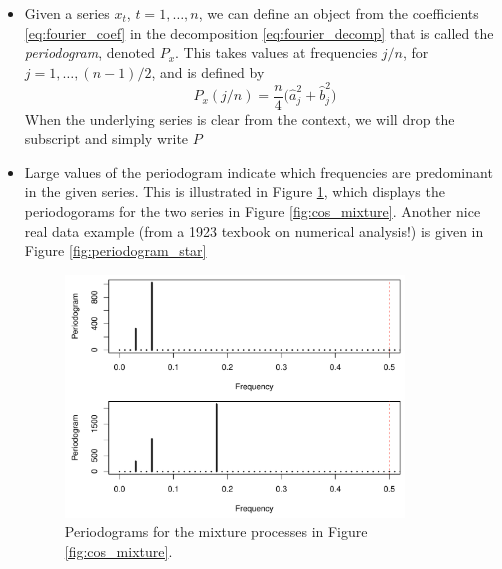 \documentclass{article}
\begin{document}
\begin{itemize}
\item Given a series $x_t$, $t = 1,\dots,n$, we can define an object from the
  coefficients \eqref{eq:fourier_coef} in the decomposition
  \eqref{eq:fourier_decomp} that is called the \emph{periodogram}, denoted 
  $P_x$. This takes values at frequencies $j/n$, for $j = 1,\dots,(n-1)/2$, and
  is defined by    
  \begin{equation}
  \label{eq:periodogram}
  P_x(j/n) = \frac{n}{4} \big( \hat{a}_j^2 + \hat{b}_j^2 \big)
  \end{equation}
  When the underlying series is clear from the context, we will drop the
  subscript and simply write $P$ 

\item Large values of the periodogram indicate which frequencies are predominant
  in the given series. This is illustrated in Figure \ref{fig:periodogram_mix},
  which displays the periodogorams for the two series in Figure
  \ref{fig:cos_mixture}. Another nice real data example (from a 1923 texbook on
  numerical analysis!) is given in Figure \ref{fig:periodogram_star}  

\begin{figure}[htb]
\centering
\includegraphics[width=0.85\textwidth]{fig/periodogram-mix-1.pdf}
\caption{Periodograms for the mixture processes in Figure
  \ref{fig:cos_mixture}.} 
\label{fig:periodogram_mix}
\end{figure}


\end{itemize}
\end{document}
